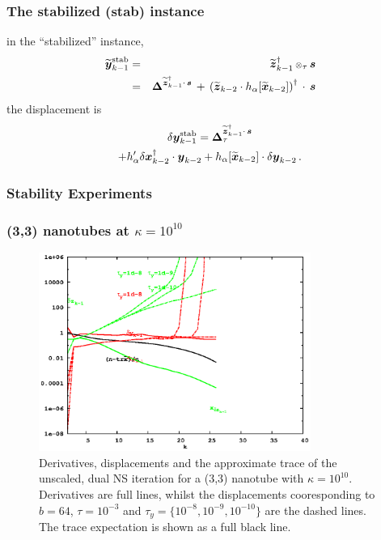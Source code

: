 \documentclass[letterpaper,twocolumn,amsmath,amsfont,amssymb,english,aps,jcp,preprintnumbers,groupaddress,nofootinbib,tightenlines]{revtex4}
\newcommand{\mat}[1]{\boldsymbol{#1}}
\newcommand{\ot}{ {\scriptstyle \otimes}_{ \tau } }
\begin{document}
\subsubsection{The stabilized  (stab) instance}

in the ``stabilized'' instance,
\begin{eqnarray}
\widetilde{\mat{y}}^{\rm stab}_{k-1} &=& \widetilde{\mat{z}}^{\dagger}_{k-1} \, \ot \, \mat{s} \\
                                  &=& \mat{\Delta}^{\widetilde{\mat{z}}^\dagger_{k-1} \cdot \, \mat{s}} \, + \,
\left( \widetilde{\mat{z}}_{k-2} \cdot h_\alpha[ \widetilde{\mat{x}}_{k-2}] \right)^\dagger \, \cdot \, \mat{s}
\end{eqnarray}
the displacement is
\begin{multline}
\delta \mat{y}^{\rm stab}_{k-1}= \mat{\Delta}^{\widetilde{\mat{z}}^\dagger_{k-1} \cdot \, \mat{s}}_\tau  \\ +
h'_\alpha \delta \mat{x}^\dagger_{k-2} \cdot \mat{y}_{k-2}
+ h_\alpha [ \widetilde{\mat{x}}_{k-2}] \cdot \delta \mat{y}_{k-2}  \,.
\end{multline}

\subsubsection{Stability Experiments}

\subsubsection{(3,3) nanotubes at $\kappa=10^{10}$}


\begin{figure}[h]
\includegraphics[width=3.5in]{fig_33_tube_cond_10_noscaling/33_nanotube_cond10_noscale_dual.eps}
\caption{Derivatives, displacements and the approximate trace of the unscaled, dual NS iteration for a (3,3) nanotube with $\kappa =10^{10}$.
Derivatives are full lines, whilst the displacements cooresponding to $b=64$, $\tau=10^{-3}$ and $\tau_y=\{10^{-8}, 10^{-9}, 10^{-10}\}$
are the dashed lines.  The trace expectation is shown as a full black line. }
\end{figure}
\end{document}
